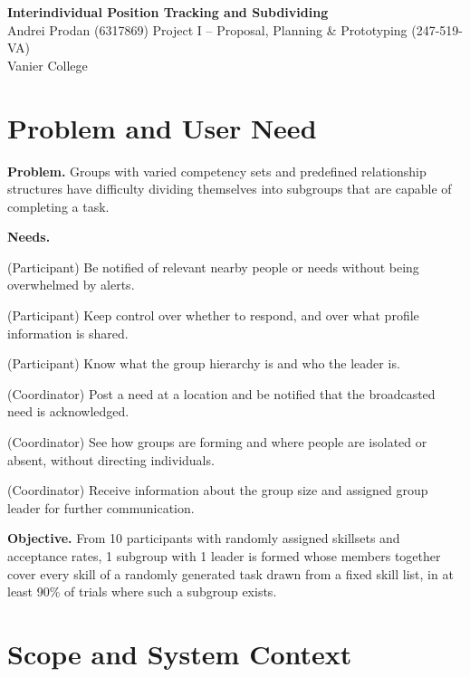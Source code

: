 \documentclass[10pt]{article}
\begin{document}
\begin{center}
  {\Large\textbf{Interindividual Position Tracking and Subdividing}}\\[3pt]
  Andrei Prodan (6317869) \quad Project I -- Proposal, Planning \& Prototyping (247-519-VA)\\
  Vanier College
\end{center}

\section{Problem and User Need}
\textbf{Problem.} Groups with varied competency sets and predefined relationship structures have difficulty dividing themselves into subgroups that are capable of completing a task.

\textbf{Needs.}
\begin{description}[leftmargin=2.2em,labelwidth=2em,style=sameline]
  \item[N1] (Participant) Be notified of relevant nearby people or needs without being overwhelmed by alerts.
  \item[N2] (Participant) Keep control over whether to respond, and over what profile information is shared.
  \item[N3] (Participant) Know what the group hierarchy is and who the leader is.
  \item[N4] (Coordinator) Post a need at a location and be notified that the broadcasted need is acknowledged.
  \item[N5] (Coordinator) See how groups are forming and where people are isolated or absent, without directing individuals.
  \item[N6] (Coordinator) Receive information about the group size and assigned group leader for further communication.
\end{description}

\textbf{Objective.} From 10 participants with randomly assigned skillsets and acceptance rates, 1 subgroup with 1 leader is formed whose members together cover every skill of a randomly generated task drawn from a fixed skill list, in at least 90\% of trials where such a subgroup exists.

\section{Scope and System Context}
\end{document}
